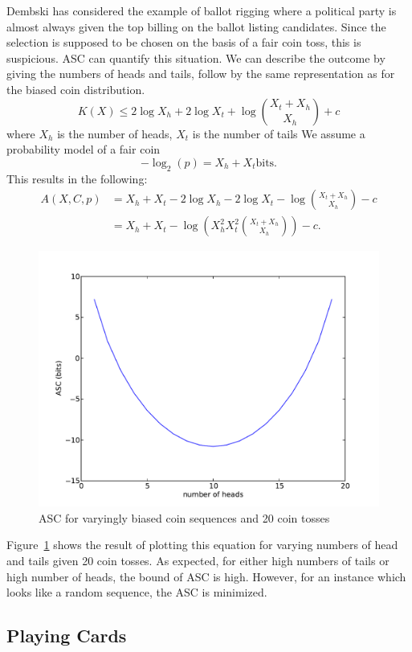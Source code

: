 Dembski \citep{Dembski1998} has considered the example of ballot rigging where a political party is almost always given the top billing on the ballot listing candidates.
Since the selection is supposed to be chosen on the basis of a fair coin toss, this is suspicious.
ASC can quantify this situation.
We can describe the outcome by giving the numbers of heads and tails, follow by the same representation as for the biased coin distribution.
\begin{equation}
    K(X) \leq 2 \log X_h + 2 \log X_t + \log {X_t + X_h \choose X_h} + c
\end{equation} where $X_h$ is the number of heads, $X_t$ is the number of tails
We assume a probability model of a fair coin
\begin{equation}
    -\log_2(p) = X_h + X_t \mbox{bits.}
\end{equation}
This results in the following:
\begin{align}
    A(X,C,p) &= X_h + X_t - 2 \log X_h -  2 \log X_t - \log {X_t + X_h \choose X_h} - c \nonumber \\
    &= X_h + X_t - \log \left( X_h^2 X_t^2 {X_t + X_h \choose X_h} \right) - c \mbox{.}
\end{align}
\begin{figure}
    \begin{center}
        \includegraphics[width=.5\textwidth]{EwertCoin}
    \end{center}
    \caption{ASC for varyingly biased coin sequences and 20 coin tosses}
    \label{fig_coins}
\end{figure}
Figure~\ref{fig_coins} shows the result of plotting this equation for varying numbers of head and tails given 20 coin tosses.
As expected, for either high numbers of tails or high number of heads, the bound of ASC is high.
However, for an instance which looks like a random sequence, the ASC is minimized.


\subsection{Playing Cards}

